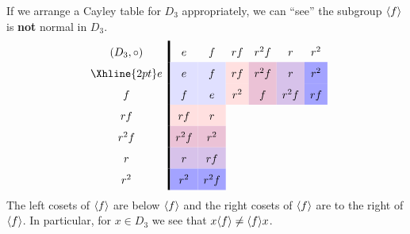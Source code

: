 \documentclass{ximera}
\begin{document}
\begin{example}
  If we arrange a Cayley table for $D_3$ appropriately, we can ``see''
  the subgroup $\langle f\rangle$ is \textbf{not} normal in $D_3$.
    \[
    \renewcommand{\arraystretch}{1.6}
    \begin{array}{c!{\vline width 2pt}cccccc}
      (D_3,\circ)& e                         & f                              & rf                            & r^2f                             & r                                    & r^2  \\  \Xhline{2pt}
      e          & e\cellcolor{blue!12!white}     & f\cellcolor{blue!12!white}    & rf\cellcolor{red!12!white}   & r^2f \cellcolor{blue!33!red!24!white}     & r  \cellcolor{blue!66!red!24!white}   & r^2 \cellcolor{blue!36!white} \\  
      f                & f\cellcolor{blue!12!white}    & e\cellcolor{blue!12!white}   & r^2 \cellcolor{red!12!white}    & f\cellcolor{blue!33!red!24!white} & r^2f \cellcolor{blue!66!red!24!white}    & rf \cellcolor{blue!36!white}   \\  
      rf                & rf\cellcolor{red!12!white}   & r\cellcolor{red!12!white}     &    &    &  &     \\  
      r^2f       & r^2f \cellcolor{blue!33!red!24!white}   & r^2 \cellcolor{blue!33!red!24!white}   &   &      &   &   \\  
      r      & r \cellcolor{blue!66!red!24!white}   & rf \cellcolor{blue!66!red!24!white} &    &   &      &     \\  
      r^2       & r^2 \cellcolor{blue!36!white} & r^2f \cellcolor{blue!36!white}    &   &    &     &      \\  
    \end{array}
    \]
    The left cosets of $\langle f\rangle$ are below $\langle f\rangle$ and the right cosets
    of $\langle f\rangle$ are to the right of $\langle f\rangle$. In particular, for $x\in
    D_3$ we see that $x\langle f\rangle \ne \langle f\rangle x$.
\end{example}
\end{document}
